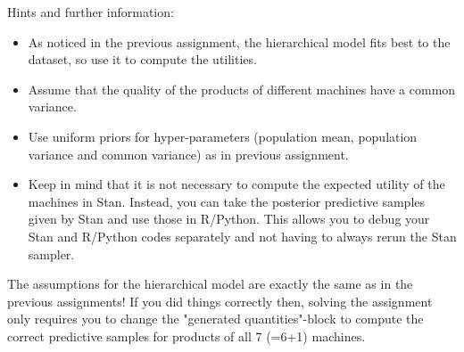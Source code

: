 \documentclass[a4paper,11pt]{article}
\begin{document}
Hints and further information:
\begin{itemize}
\item As noticed in the previous assignment, the hierarchical model fits best to the dataset, so use it to compute the utilities.  
\item Assume that the quality of the products of different machines have a common variance.
\item Use uniform priors for hyper-parameters (population mean, population variance and common variance) as in previous assignment.
\item Keep in mind that it is not necessary to compute the expected utility of the machines in Stan. Instead, you can take the posterior predictive samples given by Stan and use those in R/Python. This allows you to debug your Stan and R/Python codes separately and not having to always rerun the Stan sampler.
\end{itemize}

The assumptions for the hierarchical model are exactly the same as in the previous assignments! If you did things correctly then, solving the assignment only requires you to change the "generated quantities"-block to compute the correct predictive samples for products of all 7 (=6+1) machines. 
\end{document}
